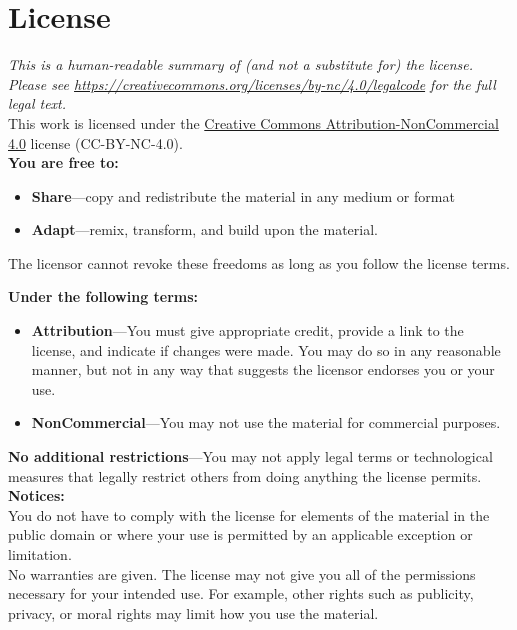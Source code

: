 \chapter{License}\label{s:license}

{\setlength{\parindent}{0em}

  \emph{
    This is a human-readable summary of (and not a substitute for) the license.
    Please see \url{https://creativecommons.org/licenses/by-nc/4.0/legalcode} for the full legal text.
  }\\

\noindent
This work is licensed under the
\href{https://creativecommons.org/licenses/by-nc/4.0/}{Creative Commons Attribution-NonCommercial 4.0} license
(CC-BY-NC-4.0).\\

\noindent
\textbf{You are free to:}

\begin{itemize}
\item
  \textbf{Share}---copy and redistribute the material in any medium or
  format
\item
  \textbf{Adapt}---remix, transform, and build upon the material.
\end{itemize}

The licensor cannot revoke these freedoms as long as you follow the
license terms.

\textbf{Under the following terms:}

\begin{itemize}
\item
  \textbf{Attribution}---You must give appropriate credit, provide a link
  to the license, and indicate if changes were made. You may do so in
  any reasonable manner, but not in any way that suggests the licensor
  endorses you or your use. \\
\item
  \textbf{NonCommercial}---You may not use the material for commercial purposes.
\end{itemize}

\textbf{No additional restrictions}---You may not apply legal terms or
technological measures that legally restrict others from doing anything the
license permits.\\

\textbf{Notices:}\\

You do not have to comply with the license for elements of the
material in the public domain or where your use is permitted by an
applicable exception or limitation.\\

No warranties are given. The license may not give you all of the
permissions necessary for your intended use. For example, other rights
such as publicity, privacy, or moral rights may limit how you use the
material.

}
